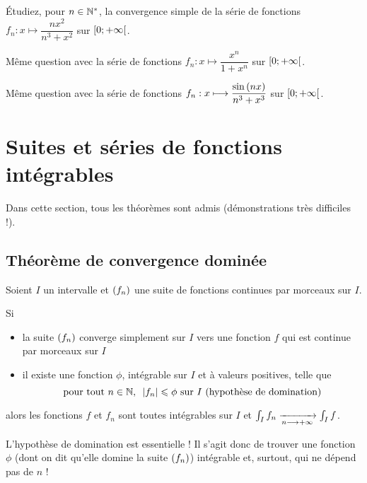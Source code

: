 \begin{exo}
Étudiez, pour \(n\in\mathbb{N}^*\), la convergence simple de la série de fonctions \(f_n:x\mapsto\dfrac{nx^2}{n^3+x^2}\) sur \(\left[0;+\infty\right[\).
\end{exo}

\begin{exo}
Même question avec la série de fonctions \(f_n:x\mapsto\dfrac{x^n}{1+x^n}\) sur \(\left[0;+\infty\right[\).
\end{exo}

\begin{exo}
Même question avec la série de fonctions \(f_n:x\longmapsto\dfrac{\sin\left(nx\right)}{n^3+x^3}\) sur \(\left[0;+\infty\right[\).
\end{exo}

\section{Suites et séries de fonctions intégrables}

Dans cette section, tous les théorèmes sont admis (démonstrations très difficiles !).

\subsection{Théorème de convergence dominée}

\begin{theo}
Soient \(I\) un intervalle et \(\left(f_n\right)\) une suite de fonctions continues par morceaux sur \(I\).

Si

\begin{itemize}
    \item la suite \(\left(f_n\right)\) converge simplement sur \(I\) vers une fonction \(f\) qui est continue par morceaux sur \(I\) \\
    \item il existe une fonction \(\phi\), intégrable sur \(I\) et à valeurs positives, telle que \[\quantifs{\tpt n\in\N}\abs{f_n}\leq\phi\text{ sur \(I\) (hypothèse de domination)}\]
\end{itemize}

alors les fonctions \(f\) et \(f_n\) sont toutes intégrables sur \(I\) et \(\int_If_n\xrightarrow[n\longrightarrow+\infty]{}\int_If\).
\end{theo}

L'hypothèse de domination est essentielle ! Il s'agit donc de trouver une fonction \(\phi\) (dont on dit qu'elle domine la suite \(\left(f_n\right)\)) intégrable et, surtout, qui ne dépend pas de \(n\) !

